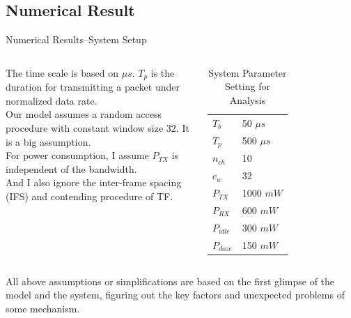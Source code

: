 \documentclass[10pt]{beamer}
\begin{document}
\subsection{Numerical Result}
\begin{frame}{Numerical Results--System Setup}
\begin{columns}[T,onlytextwidth]
	\justify
	The time scale is based on $\mu s$. $T_p$ is the duration for transmitting a packet under normalized data rate. \\
	Our model assumes a random access procedure with constant window size 32. It is a big assumption. \\
	For power consumption, I assume $P_{TX}$ is independent of the bandwidth. \\
	And I also ignore the inter-frame spacing (IFS) and contending procedure of TF. \\
 \begin{table}
    \caption{System Parameter Setting for Analysis}
    \begin{tabular}{l|l}
	\hline
	$T_b$& 50 $\mu s$ \\
	$T_p$& 500 $\mu s$ \\
	$n_{ch}$& 10 \\
	$c_w$ &32 \\
	$P_{TX}$& 1000 $mW$ \\
	$P_{RX}$& 600 $mW$ \\
	$P_{idle}$& 300 $mW$ \\
	$P_{doze}$& 150 $mW$ \\
	\hline    
    \end{tabular}
  \end{table}
  \end{columns}
  	All above assumptions or simplifications are based on the first glimpse of the model and the system, 
	figuring out the key factors and unexpected problems of some mechanism.  
\end{frame}
\end{document}
